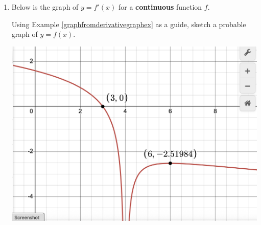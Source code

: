 \documentclass{ximera}
\begin{document}
\begin{enumerate}
\begin{enumerate}

\item  Determine the $x$-values where:

\begin{multicols}{2}

 $f(x) = 0$:
 
  $f'(x) = 0$:

\end{multicols}

\smallskip

\item List the open intervals over which:

\begin{multicols}{2}

 $f(x) > 0$:
 
  $f(x) < 0$:

\end{multicols}

\smallskip

\begin{multicols}{2}

 $f'(x) > 0$:
 
  $f'(x) < 0$:

\end{multicols}

\smallskip

\begin{multicols}{2}

 $f''(x) > 0$:
 
  $f''(x) < 0$:

\end{multicols}

\end{enumerate}


\item  Below is the graph of $y = f'(x)$ for a \textbf{continuous} function $f$.  

\smallskip

Using Example \ref{graphfromderivativegraphex} as a guide,  sketch a probable graph of $y = f(x)$.  

\begin{center}

\centerline{\includegraphics[width = 5in]{./AppDerivativesGraphics/graphfromderivativeexercise.png}}
\end{center}



\end{enumerate}
\end{document}
